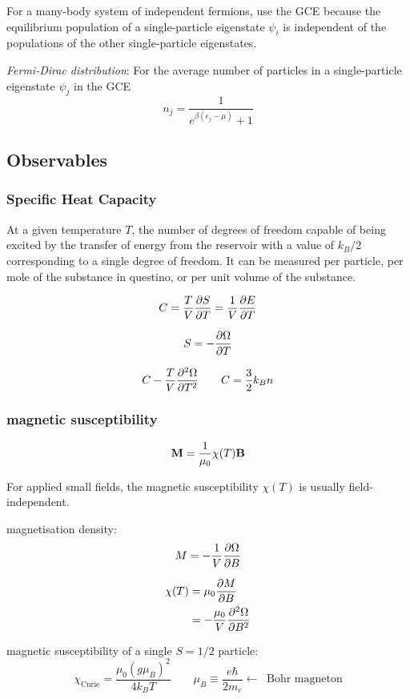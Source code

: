 \documentclass[10pt, a4paper, twocolumn]{article}
\newcommand{\deff}[1]{\par \noindent \textit{#1}: }
\newcommand{\larr}{\ensuremath{\longleftarrow\ }}
\begin{document}
For a many-body system of independent fermions, use the GCE because the equilibrium population of a single-particle eigenstate $\psi _i$ is independent of the populations of the other single-particle eigenstates. 
\deff{Fermi-Dirac distribution}
For the average number of particles in a single-particle eigenstate $\psi _j$ in the GCE
\[ n_j = \frac{1}{e^{\beta(\epsilon _j - \mu)} + 1} \]

\subsection{Observables}
\subsubsection{Specific Heat Capacity}
At a given temperature $T$, the number of degrees of freedom capable of being excited by the transfer of energy from the reservoir with a value of $k_B/2$ corresponding to a single degree of freedom. It can be measured per particle, per mole of the substance in questino, or per unit volume of the substance.

\[ C = \frac{T}{V} \pdv{S}{T} = \frac1V \pdv{E}{T} \]

\[ S = - \pdv{\Omega}{T} \]

\[ C -\frac{T}{V} \pdv[2]{\Omega}{T}
\qquad C = \frac32 k_B n \]

\subsubsection{magnetic susceptibility}

\[ \vb M = \frac{1}{\mu _0} \chi (T) \vb B \]

For applied small fields, the magnetic susceptibility $\chi (T)$ is usually field-independent.

magnetisation density:
\[ M = - \frac1V \pdv{\Omega}{B} \]

\begin{equation*}
\begin{aligned}
\chi (T) &= \mu _0 \pdv{M}{B}
\\ &= -\frac{\mu _0}{V} \pdv[2]{\Omega}{B}
\end{aligned}
\end{equation*}

magnetic susceptibility of a single $S = 1/2$ particle:
\[ \chi _\mathrm{Curie} = \frac{\mu _0 (g \mu _B )^2}
{4 k_B T} \qquad \mu _B \equiv \frac{e \hbar}{2m_e}
\larr \text{ Bohr magneton}
\]
\end{document}
